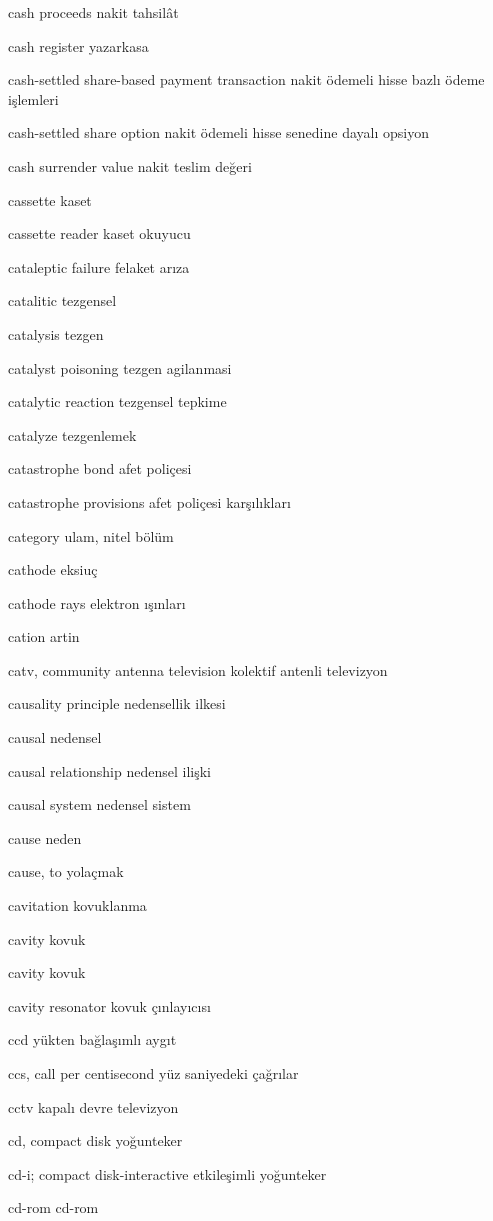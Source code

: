 \documentclass[12pt,fleqn]{article}\usepackage{../../common}
\begin{document}
cash proceeds nakit tahsilât

cash register yazarkasa

cash-settled share-based payment transaction nakit ödemeli hisse bazlı ödeme işlemleri

cash-settled share option nakit ödemeli hisse senedine dayalı opsiyon

cash surrender value nakit teslim değeri

cassette kaset

cassette reader kaset okuyucu

cataleptic failure felaket arıza

catalitic tezgensel

catalysis tezgen

catalyst poisoning tezgen agilanmasi

catalytic reaction tezgensel tepkime

catalyze tezgenlemek

catastrophe bond afet poliçesi

catastrophe provisions afet poliçesi karşılıkları

category ulam, nitel bölüm

cathode eksiuç

cathode rays elektron ışınları

cation artin

catv, community antenna television kolektif antenli televizyon

causality principle nedensellik ilkesi

causal nedensel

causal relationship nedensel ilişki

causal system nedensel sistem

cause neden

cause, to yolaçmak

cavitation kovuklanma

cavity kovuk

cavity kovuk

cavity resonator kovuk çınlayıcısı

ccd yükten bağlaşımlı aygıt

ccs, call per centisecond yüz saniyedeki çağrılar

cctv kapalı devre televizyon

cd, compact disk yoğunteker

cd-i; compact disk-interactive etkileşimli yoğunteker

cd-rom cd-rom
\end{document}
